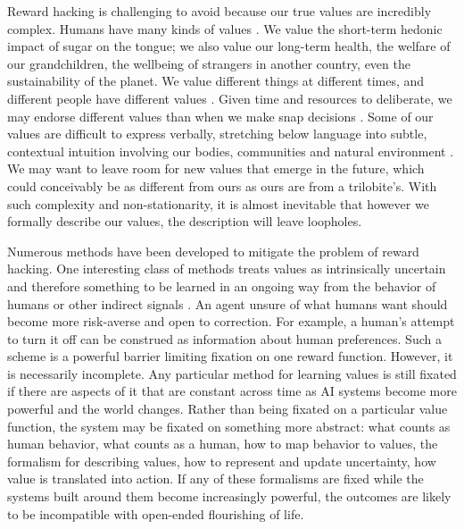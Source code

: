 \documentclass[11pt]{article}
\begin{document}
Reward hacking is challenging to avoid because our true values are incredibly complex. Humans have many kinds of values \citep{nagel1979fragmentation}. We value the short-term hedonic impact of sugar on the tongue; we also value our long-term health, the welfare of our grandchildren, the wellbeing of strangers in another country, even the sustainability of the planet. We value different things at different times, and different people have different values \citep{rawls1993political, leibo2026theory}. Given time and resources to deliberate, we may endorse different values than when we make snap decisions \citep{yudkowsky2004coherent, suter2011time}. Some of our values are difficult to express verbally, stretching below language into subtle, contextual intuition involving our bodies, communities and natural environment \citep{polanyi1966tacit, varela1999ethical, johnson2014morality,abram1996spell,pfeifer2006body}. We may want to leave room for new values that emerge in the future, which could conceivably be as different from ours as ours are from a trilobite's. With such complexity and non-stationarity, it is almost inevitable that however we formally describe our values, the description will leave loopholes.


Numerous methods have been developed to mitigate the problem of reward hacking. One interesting class of methods treats values as intrinsically uncertain and therefore something to be learned in an ongoing way from the behavior of humans or other indirect signals \citep{russell2019human, hadfieldmenell2017off, shah2020benefits, hadfieldmenell2016cooperative, jeon2020reward}. An agent unsure of what humans want should become more risk-averse and open to correction. For example, a human's attempt to turn it off can be construed as information about human preferences. Such a scheme is a powerful barrier limiting fixation on one reward function. However, it is necessarily incomplete. Any particular method for learning values is still fixated if there are aspects of it that are constant across time as AI systems become more powerful and the world changes. Rather than being fixated on a particular value function, the system may be fixated on something more abstract: what counts as human behavior, what counts as a human, how to map behavior to values, the formalism for describing values, how to represent and update uncertainty, how value is translated into action. If any of these formalisms are fixed while the systems built around them become increasingly powerful, the outcomes are likely to be incompatible with open-ended flourishing of life.
\end{document}
